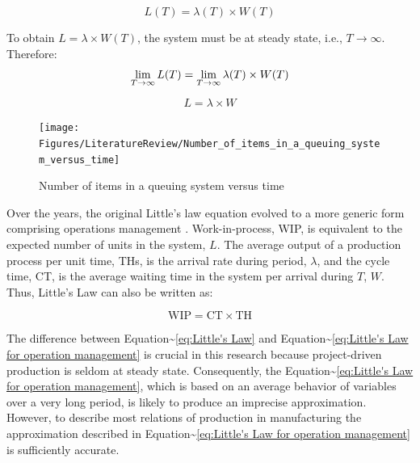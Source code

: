 \documentclass{article}
\begin{document}
\begin{equation}\label{eq:Little's Law}
    L(T) = \lambda (T) \times W(T)
\end{equation}

To obtain \(L=\lambda \times W(T)\), the system must be at steady state, i.e., \(T \rightarrow \infty\).
Therefore:
\begin{equation}
    \lim_{T\rightarrow\infty} L(T) = \lim_{T\rightarrow\infty} \lambda(T) \times W(T) \\
\end{equation}

\begin{equation}\label{eq:Little's Law average}
    L=\lambda \times W
\end{equation}

\begin{figure}[H]
  \centering
  \texttt{[image: Figures/LiteratureReview/Number\_of\_items\_in\_a\_queuing\_system\_versus\_time]}
  \caption{Number of items in a queuing system versus time}\label{fig:Number of items in a queuing system versus time}
\end{figure}

Over the years, the original Little's law equation \citep{Little1961} evolved to a more generic form comprising operations management \citep{Hopp2001}.
Work-in-process, WIP, is equivalent to the expected number of units in the system, \(L\).
The average output of a production process per unit time, THs, is the arrival rate during period, \(\lambda\), and the cycle time, CT, is the average waiting time in the system per arrival during \(T\), \(W\).
Thus, Little's Law can also be written as:

\begin{equation}
  \mbox{WIP} = \mbox{CT} \times \mbox{TH}
   \label{eq:Little's Law for operation management}
\end{equation}

The difference between Equation\textasciitilde{}\ref{eq:Little's Law} and Equation\textasciitilde{}\ref{eq:Little's Law for operation management} is crucial in this research because project-driven production is seldom at steady state.
Consequently, the Equation\textasciitilde{}\ref{eq:Little's Law for operation management}, which is based on an average behavior of variables over a very long period, is likely to produce an imprecise approximation.
However, to describe most relations of production in manufacturing the approximation described in Equation\textasciitilde{}\ref{eq:Little's Law for operation management} is sufficiently accurate.
\end{document}
